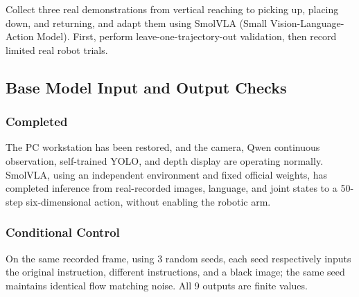 \label{stage:s07}

Collect three real demonstrations from vertical reaching to picking up, placing down, and returning, and adapt them using SmolVLA (Small Vision-Language-Action Model). First, perform leave-one-trajectory-out validation, then record limited real robot trials.

\subsection{Base Model Input and Output Checks}\label{s07-detail-1}

\subsubsection{Completed}\label{s07-detail-2}

The PC workstation has been restored, and the camera, Qwen continuous observation, self-trained YOLO, and depth display are operating normally. SmolVLA, using an independent environment and fixed official weights, has completed inference from real-recorded images, language, and joint states to a 50-step six-dimensional action, without enabling the robotic arm.

\subsubsection{Conditional Control}\label{s07-detail-3}

On the same recorded frame, using 3 random seeds, each seed respectively inputs the original instruction, different instructions, and a black image; the same seed maintains identical flow matching noise. All 9 outputs are finite values.

